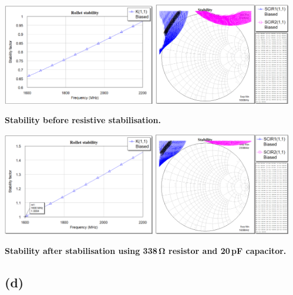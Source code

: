 \documentclass[12pt]{article}
\begin{document}
\begin{center}
    \includegraphics[width=0.5\textwidth]{5 rollet.png}
    \quad
    \includegraphics[width=0.45\textwidth]{5 stability circles.png}

    \textbf{Stability before resistive stabilisation.}

    \includegraphics[width=0.5\textwidth]{5 rollet 2.png}
    \quad
    \includegraphics[width=0.45\textwidth]{5 stability circles 2.png}

    \textbf{Stability after stabilisation using 338\,\unit{\ohm} resistor and 20\,\unit{\pico\farad} capacitor.}
\end{center}

\subsection*{(d)}
\end{document}
